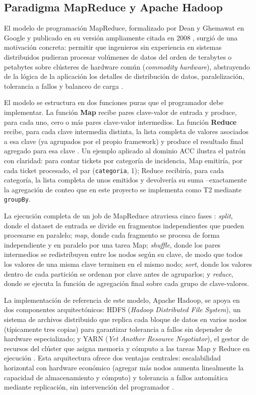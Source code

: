 \documentclass[11pt,a4paper]{article}
\begin{document}
\subsection{Paradigma MapReduce y Apache Hadoop}
\label{sec:fundamento-mapreduce}

El modelo de programaci\'on MapReduce, formalizado por Dean y Ghemawat en
Google y publicado en su versi\'on ampliamente citada en 2008
\cite{dean2008}, surgi\'o de una motivaci\'on concreta: permitir que
ingenieros sin experiencia en sistemas distribuidos pudieran procesar
vol\'umenes de datos del orden de terabytes o petabytes sobre cl\'usteres de
hardware com\'un (\emph{commodity hardware}), abstrayendo de la l\'ogica de
la aplicaci\'on los detalles de distribuci\'on de datos, paralelizaci\'on,
tolerancia a fallos y balanceo de carga \cite{dean2008,white2015}.

El modelo se estructura en dos funciones puras que el programador debe
implementar. La funci\'on \textbf{Map} recibe pares clave-valor de entrada y
produce, para cada uno, cero o m\'as pares clave-valor intermedios. La
funci\'on \textbf{Reduce} recibe, para cada clave intermedia distinta, la
lista completa de valores asociados a esa clave (ya agrupados por el propio
framework) y produce el resultado final agregado para esa clave
\cite{dean2008}. Un ejemplo aplicado al dominio ACC ilustra el patr\'on con
claridad: para contar tickets por categor\'ia de incidencia, Map emitir\'ia,
por cada ticket procesado, el par (\texttt{categoria}, 1); Reduce
recibir\'ia, para cada categor\'ia, la lista completa de unos emitidos y
devolver\'ia su suma --exactamente la agregaci\'on de conteo que en este
proyecto se implementa como T2 mediante \texttt{groupBy}.

La ejecuci\'on completa de un job de MapReduce atraviesa cinco fases
\cite{dean2008,white2015}: \emph{split}, donde el dataset de entrada se
divide en fragmentos independientes que pueden procesarse en paralelo;
\emph{map}, donde cada fragmento se procesa de forma independiente y en
paralelo por una tarea Map; \emph{shuffle}, donde los pares intermedios se
redistribuyen entre los nodos seg\'un su clave, de modo que todos los valores
de una misma clave terminen en el mismo nodo; \emph{sort}, donde los valores
dentro de cada partici\'on se ordenan por clave antes de agruparlos; y
\emph{reduce}, donde se ejecuta la funci\'on de agregaci\'on final sobre cada
grupo de clave-valores.

La implementaci\'on de referencia de este modelo, Apache Hadoop, se apoya en
dos componentes arquitect\'onicos: HDFS (\emph{Hadoop Distributed File
System}), un sistema de archivos distribuido que replica cada bloque de
datos en varios nodos (t\'ipicamente tres copias) para garantizar tolerancia
a fallos sin depender de hardware especializado; y YARN (\emph{Yet Another
Resource Negotiator}), el gestor de recursos del cl\'uster que asigna
memoria y c\'omputo a las tareas Map y Reduce en ejecuci\'on
\cite{white2015,dean2008}. Esta arquitectura ofrece dos ventajas centrales:
escalabilidad horizontal con hardware econ\'omico (agregar m\'as nodos
aumenta linealmente la capacidad de almacenamiento y c\'omputo) y tolerancia
a fallos autom\'atica mediante replicaci\'on, sin intervenci\'on del
programador \cite{white2015}.
\end{document}
